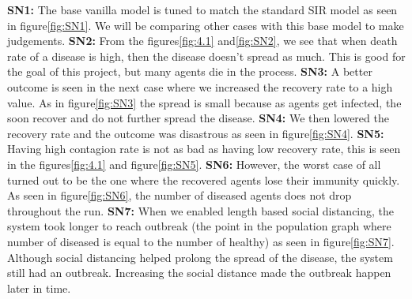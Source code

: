 \documentclass[a4paper,11pt]{article}
\begin{document}
    \textbf{SN1:} The base vanilla model is tuned to match the standard SIR model as seen in figure\ref{fig:SN1}.
    We will be comparing other cases with this base model to make judgements.
    \textbf{SN2:} From the figures\ref{fig:4.1} and\ref{fig:SN2}, we see that when death rate of a disease is high, then the disease doesn't spread as much.
    This is good for the goal of this project, but many agents die in the process.
    \textbf{SN3:} A better outcome is seen in the next case where we increased the recovery rate to a high value.
    As in figure\ref{fig:SN3} the spread is small because as agents get infected, the soon recover and do not further spread the disease.
    \textbf{SN4:} We then lowered the recovery rate and the outcome was disastrous as seen in figure\ref{fig:SN4}.
    \textbf{SN5:} Having high contagion rate is not as bad as having low recovery rate, this is seen in the figures\ref{fig:4.1} and figure\ref{fig:SN5}.
    \textbf{SN6:} However, the worst case of all turned out to be the one where the recovered agents lose their immunity quickly.
    As seen in figure\ref{fig:SN6}, the number of diseased agents does not drop throughout the run.
    \textbf{SN7:} When we enabled length based social distancing\cite{3b1b}, the system took longer to reach outbreak (the point in the population graph where number of diseased is equal to the number of healthy) as seen in figure\ref{fig:SN7}.
    Although social distancing helped prolong the spread of the disease, the system still had an outbreak.
    Increasing the social distance made the outbreak happen later in time.
\end{document}
